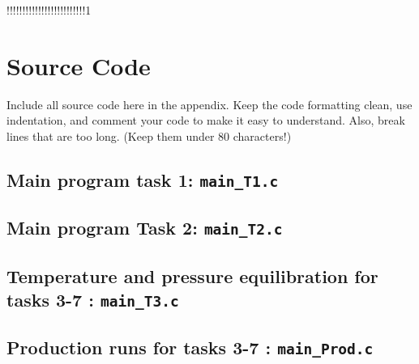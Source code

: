 !!!!!!!!!!!!!!!!!!!!!!!!!1

\newpage

\appendix

\section{Source Code}

Include all source code here in the appendix. Keep the code formatting clean,
use indentation, and comment your code to make it easy to understand. Also,
break lines that are too long. (Keep them under 80 characters!)

%

%

\subsection{Main program task 1: \texttt{main\_T1.c}}


\subsection{Main program  Task 2: \texttt{main\_T2.c}}


\subsection{Temperature and pressure equilibration for tasks 3-7 : \texttt{main\_T3.c}}


\subsection{Production runs for tasks 3-7 : \texttt{main\_Prod.c}}


